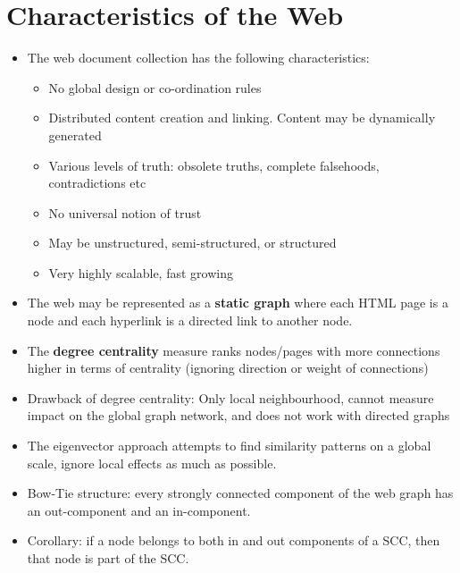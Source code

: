 \documentclass{article}
\begin{document}
\section{Characteristics of the Web}
\begin{itemize}
    \item The web document collection has the following characteristics:
    \begin{itemize}
        \item No global design or co-ordination rules
        
        \item Distributed content creation and linking. Content may be dynamically generated
        
        \item Various levels of truth: obsolete truths, complete falsehoods, contradictions etc
        
        \item No universal notion of trust
        
        \item May be unstructured, semi-structured, or structured
        
        \item Very highly scalable, fast growing
    \end{itemize}
    
    \item The web may be represented as a \textbf{static graph} where each HTML page is a node and each hyperlink is a directed link to another node. 
    
    \item The \textbf{degree centrality} measure ranks nodes/pages with more connections higher in terms of centrality (ignoring direction or weight of connections)
    
    \item Drawback of degree centrality: Only local neighbourhood, cannot measure impact on the global graph network, and does not work with directed graphs
    
    \item The eigenvector approach attempts to find similarity patterns on a global scale, ignore local effects as much as possible.
    
    \item Bow-Tie structure: every strongly connected component of the web graph has an out-component and an in-component.
    
    \item Corollary: if a node belongs to both in and out components of a SCC, then that node is part of the SCC. 
\end{itemize}
\end{document}
